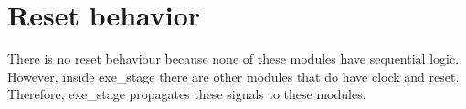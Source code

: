 \section{Reset behavior}

There is no reset behaviour because none of these modules have sequential logic. However, inside exe\_stage there are other modules that do have clock and reset. Therefore, exe\_stage propagates these signals to these modules.



